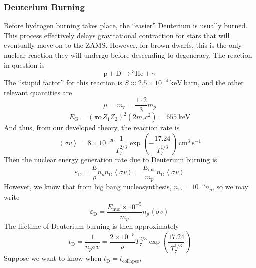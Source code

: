 \documentclass[10pt]{article}
\numberwithin{equation}{section}
\newcommand{\avg}[1]{\left\langle#1\right\rangle}
\begin{document}
	\subsubsection{Deuterium Burning} %
	\label{ssub:deuterium_burning}
	Before hydrogen burning takes place, the ``easier'' Deuterium is
  usually burned. This process effectively delays gravitational
  contraction for stars that will eventually move on to the
  ZAMS. However, for brown dwarfs, this is the only nuclear reaction
  they will undergo before descending to degeneracy. The reaction in
  question is
  \begin{equation}
    \label{eq:163}
    \mathrm{p+D\to {}^3He+\gamma}
  \end{equation}
  The ``stupid factor'' for this reaction is $S\approx 2.5\times
  10^{-4}\ \mathrm{keV\ barn}$, and the other relevant quantities are
  \begin{equation}
    \label{eq:311}
    \mu=m_r=\frac{1\cdot 2}{3}m_p
  \end{equation}
  \begin{equation}
    \label{eq:312}
    E_\mathrm{G}=\left(\pi\alpha
      Z_1Z_2\right)^2\left(2m_rc^2\right)=655\ \mathrm{keV}
  \end{equation}
  And thus, from our developed theory, the reaction rate is
  \begin{equation}
    \label{eq:313}
    \avg{\sigma v}=8\times
    10^{-20}\frac{1}{T_7^{2/3}}\exp\left(-\frac{17.24}{T_7^{1/3}}\right)\
    \mathrm{cm^{3}\ s^{-1}}
  \end{equation}
  Then the nuclear energy generation rate due to Deuterium burning is
  \begin{equation}
    \label{eq:314}
    \varepsilon_\mathrm{D}=\frac{E}{\rho}n_pn_\mathrm{D}\avg{\sigma
      v}=\frac{E_{\mathrm{nuc}}}{m_p}n_\mathrm{D}\avg{\sigma v}
  \end{equation}
  However, we know that from big bang nucleosynthesis,
  $n_\mathrm{D}=10^{-5}n_p$, so we may write
  \begin{equation}
    \label{eq:315}
    \varepsilon_{\mathrm{D}}=\frac{E_{\mathrm{nuc}}\times
      10^{-5}}{m_p}n_p\avg{\sigma v}
  \end{equation}
  The lifetime of Deuterium burning is then approximately
  \begin{equation}
    \label{eq:316}
    t_{\mathrm{D}}=\frac{1}{n_p\sigma v}=\frac{2\times
      10^{-5}}{\rho}T_7^{2/3}\exp\left(\frac{17.24}{T_7^{1/3}}\right)
  \end{equation}
  Suppose we want to know when $t_\mathrm{D}=t_{\mathrm{collapse}}$,
\end{document}
